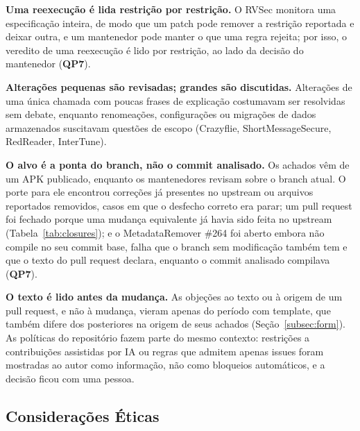 \documentclass[conference]{IEEEtran}
\newcommand{\researchq}[1]{\textbf{QP#1}}
\begin{document}
\textbf{Uma reexecução é lida restrição por restrição.} O RVSec monitora uma
especificação inteira, de modo que um patch pode remover a restrição reportada e
deixar outra, e um mantenedor pode manter o que uma regra rejeita; por isso, o
veredito de uma reexecução é lido por restrição, ao lado da decisão do mantenedor
(\researchq{7}).

\textbf{Alterações pequenas são revisadas; grandes são discutidas.} Alterações de uma
única chamada com poucas frases de explicação costumavam ser resolvidas sem
debate, enquanto renomeações, configurações ou migrações de dados armazenados suscitavam questões de
escopo (Crazyflie, ShortMessageSecure, RedReader, InterTune).

\textbf{O alvo é a ponta do branch, não o commit analisado.} Os achados vêm de
um APK publicado, enquanto os mantenedores revisam sobre o branch atual. O porte
para ele encontrou correções já presentes no upstream ou arquivos reportados
removidos, casos em que o desfecho correto era parar; um pull request foi
fechado porque uma mudança equivalente já havia sido feita no upstream
(Tabela~\ref{tab:closures}); e o MetadataRemover \#264 foi aberto embora não compile no seu
commit base, falha que o branch sem modificação também tem e que o texto do pull
request declara, enquanto o commit analisado compilava (\researchq{7}).

\textbf{O texto é lido antes da mudança.} As objeções ao texto ou à origem
de um pull request, e não à mudança, vieram apenas do período com template, que
também difere dos posteriores na origem de seus achados
(Seção~\ref{subsec:form}). As políticas do repositório fazem
parte do mesmo contexto: restrições a contribuições assistidas por IA ou regras
que admitem apenas issues foram mostradas ao autor como informação, não como
bloqueios automáticos, e a decisão ficou com uma pessoa.

\subsection{Considerações Éticas}
\label{subsec:ethics}
\end{document}
